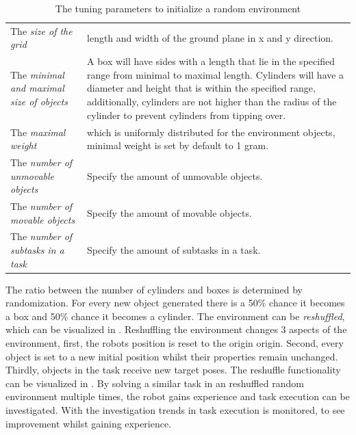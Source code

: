 \noindent
\begin{table}[H]
\centering
\begin{tabular}%
{>{\raggedright\arraybackslash}p{}%
>{\raggedright\arraybackslash}p{}}
The \textit{size of the grid} & length and width of the ground plane in \gls{x} and \gls{y} direction.\\
The \textit{minimal and maximal size of objects} & A box will have sides with a length that lie in the specified range from minimal to maximal length. Cylinders will have a diameter and height that is within the specified range, additionally, cylinders are not higher than the radius of the cylinder to prevent cylinders from tipping over. \\
The \textit{maximal weight} & which is uniformly distributed for the environment objects, minimal weight is set by default to 1 gram. \\
The \textit{number of unmovable objects} & Specify the amount of unmovable objects.\\
The \textit{number of movable objects} & Specify the amount of movable objects.\\
The \textit{number of subtasks in a task} & Specify the amount of subtasks in a task.
\end{tabular}
\caption{The tuning parameters to initialize a random environment}%
\label{table:configure_rand_env}
\end{table}

The ratio between the number of cylinders and boxes is determined by randomization. For every new object generated there is a 50\% chance it becomes a box and 50\% chance it becomes a cylinder. The environment can be \textit{reshuffled}, which can be visualized in . Reshuffling the environment changes 3 aspects of the environment, first, the robots position is reset to the origin \gls{origin}. Second, every object is set to a new initial position whilst their properties remain unchanged. Thirdly, objects in the task receive new target poses.  The reshuffle functionality can be visualized in . By solving a similar task in an reshuffled random environment multiple times, the robot gains experience and task execution can be investigated. With the investigation trends in task execution is monitored, to see improvement whilst gaining experience.\bs

